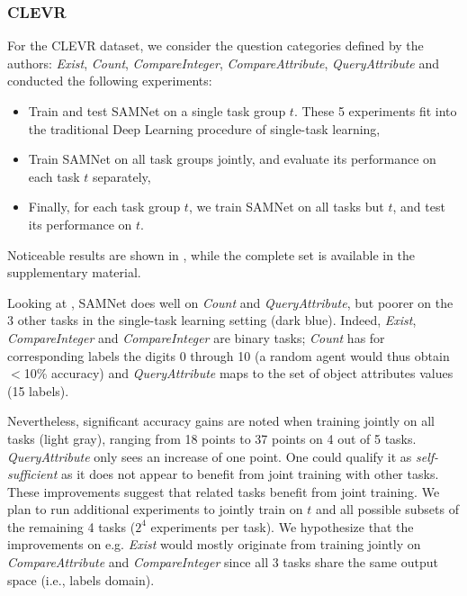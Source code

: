 \subsubsection{CLEVR}
\label{sec:reasoning-clevr}
For the CLEVR dataset, we consider the question categories defined by the authors: \textit{Exist}, \textit{Count}, \textit{CompareInteger}, \textit{CompareAttribute}, \textit{QueryAttribute} and conducted the following experiments:
\begin{itemize}
	\compresslist
	\item Train and test SAMNet on a single task group $t$. These 5 experiments fit into the traditional Deep Learning procedure of single-task learning,
	\item Train SAMNet on all task groups jointly, and evaluate its performance on each task $t$ separately,
	\item Finally, for each task group $t$, we train SAMNet on all tasks but $t$, and test its performance on $t$. %
\end{itemize}

Noticeable results are shown in , while the complete set is available in the supplementary material.%


Looking at , SAMNet does well on \textit{Count} and \textit{QueryAttribute}, but poorer on the 3 other tasks in the single-task learning setting (dark blue). Indeed, \textit{Exist}, \textit{CompareInteger} and \textit{CompareInteger} are binary tasks; \textit{Count} has for corresponding labels the digits 0 through 10 (a random agent would thus obtain $<$10\% accuracy) and \textit{QueryAttribute} maps to the set of object attributes values (15 labels).

Nevertheless, significant accuracy gains are noted when training jointly on all tasks (light gray), ranging from 18 points to 37 points on 4 out of 5 tasks. \textit{QueryAttribute} only sees an increase of one point. One could qualify it as \textit{self-sufficient} as it does not appear to benefit from joint training with other tasks. These improvements suggest that related tasks benefit from joint training.
We plan to run additional experiments to jointly train on $t$ and all possible subsets of the remaining 4 tasks ($2^4$ experiments per task). We hypothesize that the improvements on e.g. \textit{Exist} would mostly originate from training jointly on \textit{CompareAttribute} and \textit{CompareInteger} since all 3 tasks share the same output space (i.e., labels domain).

